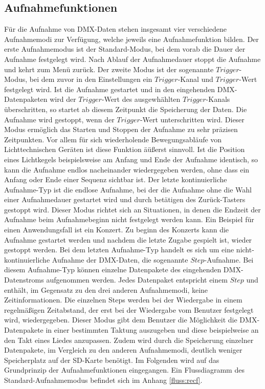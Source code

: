 
\subsection{Aufnahmefunktionen}
Für die Aufnahme von DMX-Daten stehen insgesamt vier verschiedene Aufnahmemodi zur Verfügung, welche jeweils eine Aufnahmefunktion bilden. Der erste Aufnahmemodus ist der Standard-Modus, bei dem vorab die Dauer der Aufnahme festgelegt wird. Nach Ablauf der Aufnahmedauer stoppt die Aufnahme und kehrt zum Menü zurück. Der zweite Modus ist der sogenannte $Trigger$-Modus, bei dem zuvor in den Einstellungen ein $Trigger$-Kanal und $Trigger$-Wert festgelegt wird. Ist die Aufnahme gestartet und in den eingehenden DMX-Datenpaketen wird der $Trigger$-Wert des ausgewhählten $Trigger$-Kanals überschritten, so startet ab diesem Zeitpunkt die Speicherung der Daten. Die Aufnahme wird gestoppt, wenn der $Trigger$-Wert unterschritten wird. Dieser Modus ermöglich das Starten und Stoppen der Aufnahme zu sehr präzisen Zeitpunkten. Vor allem für sich wiederholende Bewegungsabläufe von Lichttechnischen Geräten ist diese Funktion äüßerst sinnvoll. Ist die Position eines Lichtkegels beispielsweise am Anfang und Ende der Aufnahme identisch, so kann die Aufnahme endlos nacheinander wiedergegeben werden, ohne dass ein Anfang oder Ende einer Sequenz sichtbar ist. Der letzte kontinuierliche Aufnahme-Typ ist die endlose Aufnahme, bei der die Aufnahme ohne die Wahl einer Aufnahmedauer gestartet wird und durch betätigen des Zurück-Tasters gestoppt wird. Dieser Modus richtet sich an Situationen, in denen die Endzeit der Aufnahme beim Aufnahmebeginn nicht festgelegt werden kann. Ein Beispiel für einen Anwendungsfall ist ein Konzert. Zu beginn des Konzerts kann die Aufnahme gestartet werden und nachdem die letzte Zugabe gespielt ist, wieder gestoppt werden. Bei dem letzten Aufnahme-Typ handelt es sich um eine nicht-kontinuierliche Aufnahme der DMX-Daten, die sogenannte $Step$-Aufnahme. Bei diesem Aufnahme-Typ können einzelne Datenpakete des eingehenden DMX-Datenstroms aufgenommen werden. Jedes Datenpaket entspricht einem $Step$ und enthält, im Gegensatz zu den drei anderen Aufnahmemodi, keine Zeitinformationen. Die einzelnen Steps werden bei der Wiedergabe in einem regelmäßigen Zeitabstand, der erst bei der Wiedergabe vom Benutzer festgelegt wird, wiedergegeben. Dieser Modus gibt dem Benutzer die Möglichkeit die DMX-Datenpakete in einer bestimmten Taktung auszugeben und diese beispielweise an den Takt eines Liedes anzupassen. Zudem wird durch die Speicherung einzelner Datenpakete, im Vergleich zu den anderen Aufnahmemodi, deutlich weniger Speicherplatz auf der SD-Karte benötigt. 
Im Folgenden wird auf das Grundprinzip der Aufnahmefunktionen eingegangen. Ein Flussdiagramm des Standard-Aufnahmemodus befindet sich im Anhang \ref{fluss:recf}.

